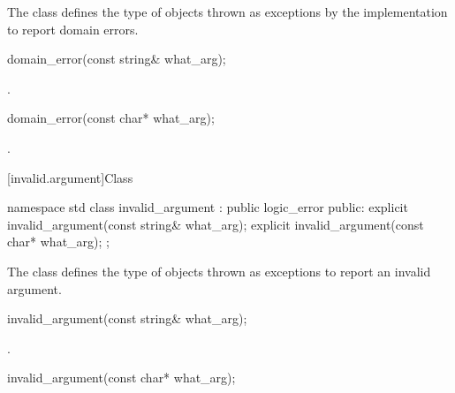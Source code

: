 \pnum
The class
defines the type of objects thrown as
exceptions by the implementation to report domain errors.

%
\begin{itemdecl}
domain_error(const string& what_arg);
\end{itemdecl}

\begin{itemdescr}

\pnum
\ensures
{}.
\end{itemdescr}

%
\begin{itemdecl}
domain_error(const char* what_arg);
\end{itemdecl}

\begin{itemdescr}

\pnum
\ensures
{}.
\end{itemdescr}

[invalid.argument]{Class }

%
\begin{codeblock}
namespace std {
  class invalid_argument : public logic_error {
  public:
    explicit invalid_argument(const string& what_arg);
    explicit invalid_argument(const char* what_arg);
  };
}
\end{codeblock}

\pnum
The class
defines the type of objects thrown as exceptions to report an invalid argument.

%
\begin{itemdecl}
invalid_argument(const string& what_arg);
\end{itemdecl}

\begin{itemdescr}

\pnum
\ensures
{}.
\end{itemdescr}

%
\begin{itemdecl}
invalid_argument(const char* what_arg);
\end{itemdecl}

